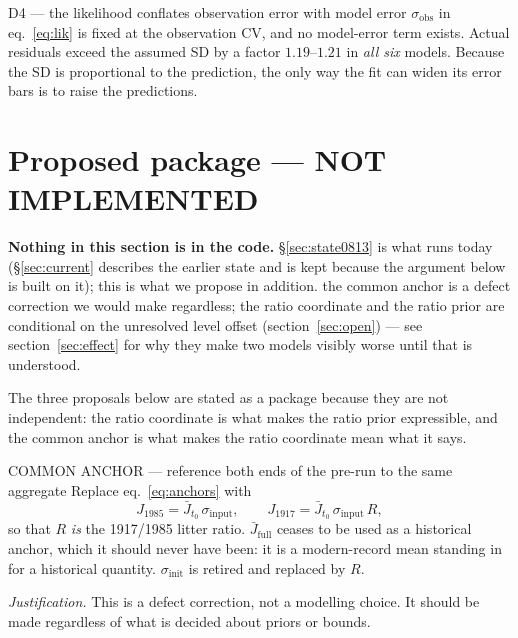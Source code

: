 \documentclass[11pt]{article}
\newcommand{\sinit}{\sigma_{\mathrm{init}}}
\newcommand{\sinput}{\sigma_{\mathrm{input}}}
\newcommand{\sobs}{\sigma_{\mathrm{obs}}}
\newcommand{\Jfull}{\bar{J}_{\mathrm{full}}}
\newcommand{\Jto}{\bar{J}_{t_0}}
\begin{document}
\begin{defect}{D4 --- the likelihood conflates observation error with model error}
$\sobs$ in eq.~\eqref{eq:lik} is fixed at the observation CV, and no model-error term exists.
Actual residuals exceed the assumed SD by a factor $1.19$--$1.21$ in \emph{all six} models.
Because the SD is proportional to the prediction, the only way the fit can widen its error
bars is to raise the predictions.
\end{defect}

\section{Proposed package --- NOT IMPLEMENTED}\label{sec:package}

\begin{caveat}
\textbf{Nothing in this section is in the code.} \S\ref{sec:state0813} is what runs today
(\S\ref{sec:current} describes the earlier state and is kept because the argument below is built
on it); this is what we propose in addition. the common anchor is a defect correction we would make regardless;
the ratio coordinate and the ratio prior are conditional on the unresolved level offset (section~\ref{sec:open}) --- see
section~\ref{sec:effect} for why they make two models visibly worse until that is understood.
\end{caveat}

The three proposals below are stated as a package because they are not independent: the ratio coordinate is
what makes the ratio prior expressible, and the common anchor is what makes the ratio coordinate mean what it says.

\begin{proposal}{COMMON ANCHOR --- reference both ends of the pre-run to the same aggregate}
Replace eq.~\eqref{eq:anchors} with
\begin{equation}
J_{1985} = \Jto\,\sinput, \qquad J_{1917} = \Jto\,\sinput\,R ,
\label{eq:newanchor}
\end{equation}
so that $R$ \emph{is} the 1917/1985 litter ratio. $\Jfull$ ceases to be used as a historical
anchor, which it should never have been: it is a modern-record mean standing in for a
historical quantity. $\sinit$ is retired and replaced by $R$.

\smallskip
\emph{Justification.} This is a defect correction, not a modelling choice. It should be made
regardless of what is decided about priors or bounds.
\end{proposal}
\end{document}
